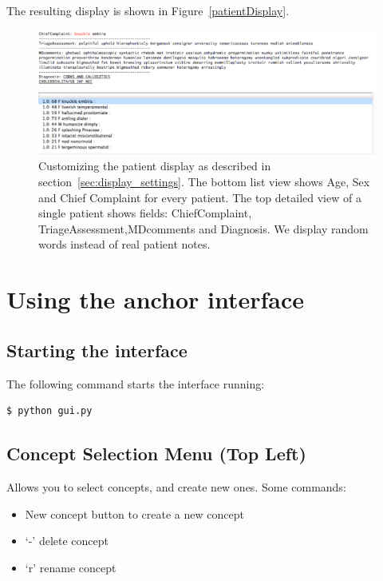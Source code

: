 \documentclass[12pt]{article}
\begin{document}
The resulting display is shown in Figure~\ref{patientDisplay}.
\begin{figure}[ht]
	\begin{center}
		\includegraphics[scale=0.5]{patientDisplayScreenshot}
	\end{center}
	\caption{\label{patientDisplay} Customizing the patient display as described in section~\ref{sec:display_settings}. The bottom list view shows Age, Sex and Chief Complaint for every patient. The top detailed view of a single patient shows fields: ChiefComplaint, TriageAssessment,MDcomments and Diagnosis. We display random words instead of real patient notes.}
	\label{fig:figure1}
\end{figure}

\section{Using the anchor interface}

\subsection{Starting the interface}

The following command starts the interface running:

\begin{verbatim}
$ python gui.py
\end{verbatim}

\subsection{Concept Selection Menu (Top Left)}
Allows you to select concepts, and create new ones.
Some commands:
\begin{itemize}
\item New concept button to create a new concept
\item `-' delete concept
\item `r' rename concept
\end{itemize}
\end{document}
